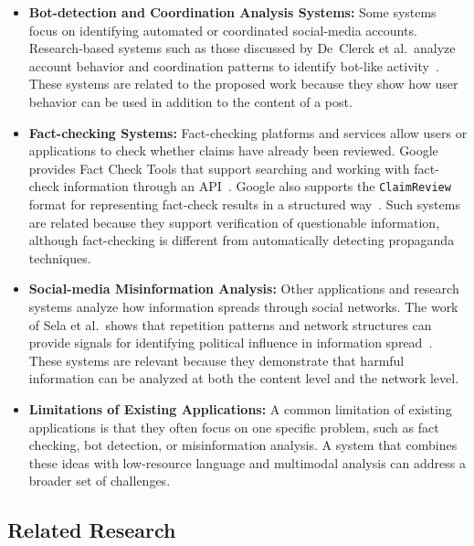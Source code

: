 \documentclass[12pt,a4paper]{report}
\begin{document}
\begin{itemize}
  \item \textbf{Bot-detection and Coordination Analysis Systems:} Some systems
        focus on identifying automated or coordinated social-media accounts.
        Research-based systems such as those discussed by De~Clerck et al.\ analyze
        account behavior and coordination patterns to identify bot-like
        activity~\cite{declerck2024}. These systems are related to the proposed work
        because they show how user behavior can be used in addition to the content
        of a post.
  \item \textbf{Fact-checking Systems:} Fact-checking platforms and services allow
        users or applications to check whether claims have already been reviewed.
        Google provides Fact Check Tools that support searching and working with
        fact-check information through an API~\cite{google_factcheck}. Google also
        supports the \texttt{ClaimReview} format for representing fact-check
        results in a structured way~\cite{google_claimreview}. Such systems are
        related because they support verification of questionable information,
        although fact-checking is different from automatically detecting
        propaganda techniques.
  \item \textbf{Social-media Misinformation Analysis:} Other applications and
        research systems analyze how information spreads through social networks.
        The work of Sela et al.\ shows that repetition patterns and network
        structures can provide signals for identifying political influence in
        information spread~\cite{sela2025}. These systems are relevant because they
        demonstrate that harmful information can be analyzed at both the content
        level and the network level.
  \item \textbf{Limitations of Existing Applications:} A common limitation of
        existing applications is that they often focus on one specific problem,
        such as fact checking, bot detection, or misinformation analysis. A system
        that combines these ideas with low-resource language and multimodal
        analysis can address a broader set of challenges.
\end{itemize}

\subsection{Related Research}
\end{document}
